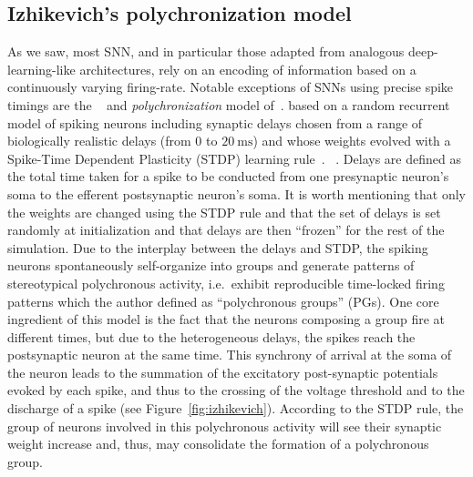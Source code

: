 \documentclass[brainsci, %
               review,submit,pdftex,moreauthors
               ]{Definitions/mdpi}
\newcommand{\ms}{\si{\milli\second}}%
\begin{document}
\subsection{Izhikevich's polychronization model}
As we saw, most SNN, and in particular those adapted from analogous deep-learning-like architectures, rely on an encoding of information based on a continuously varying firing-rate. Notable exceptions of SNNs using precise spike timings are the ~\citet{lazar_time_2004} and \emph{polychronization} model of~\citet{izhikevich_polychronization_2006}.  based on a random recurrent model of spiking neurons including synaptic delays chosen from a range of biologically realistic delays (from $0$ to $20~\ms$) and whose weights evolved with a Spike-Time Dependent Plasticity (STDP) learning rule~\citep{markram_regulation_1997}. ~\citep{caporale_spike_2008}. Delays are defined as the total time taken for a spike to be conducted from one presynaptic neuron's soma to the efferent postsynaptic neuron's soma. It is worth mentioning that only the weights are changed using the STDP rule and that the set of delays is set randomly at initialization and that delays are then ``frozen'' for the rest of the simulation. Due to the interplay between the delays and STDP, the spiking neurons spontaneously self-organize into groups and generate patterns of stereotypical polychronous activity, i.e.~exhibit reproducible time-locked firing patterns which  the author defined as ``polychronous groups'' (PGs). One core ingredient of this model is the fact that the neurons composing a group fire at different times, but due to the heterogeneous delays, the spikes reach the postsynaptic neuron at the same time. This synchrony of arrival at the soma of the neuron leads to the summation of the excitatory post-synaptic potentials evoked by each spike, and thus to the crossing of the voltage threshold and to the discharge of a spike (see Figure~\ref{fig:izhikevich}). According to the STDP rule, the group of neurons involved in this polychronous activity will see their synaptic weight increase and, thus, may consolidate the formation of a polychronous group. 
\end{document}
